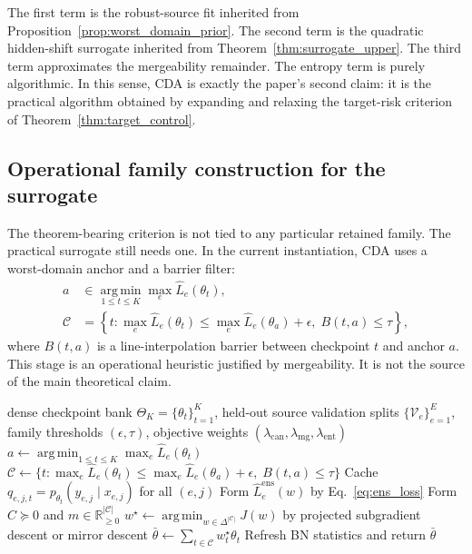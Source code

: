 \documentclass{article}
\theoremstyle{definition}
\newcommand{\RR}{\mathbb{R}}
\newcommand{\cC}{\mathcal{C}}
\newcommand{\cV}{\mathcal{V}}
\newcommand{\argmin}{\operatorname*{arg\,min}}
\newcommand{\cda}{\textup{\textsc{CDA}}}
\newcommand{\simplex}{\Delta}
\newcommand{\braces}[1]{\left\{ #1 \right\}}
\begin{document}
The first term is the robust-source fit inherited from Proposition~\ref{prop:worst_domain_prior}. The second term is the quadratic hidden-shift surrogate inherited from Theorem~\ref{thm:surrogate_upper}. The third term approximates the mergeability remainder. The entropy term is purely algorithmic. In this sense, \cda{} is exactly the paper's second claim: it is the practical algorithm obtained by expanding and relaxing the target-risk criterion of Theorem~\ref{thm:target_control}.

\subsection{Operational family construction for the surrogate}
\label{subsec:family}

The theorem-bearing criterion is not tied to any particular retained family. The practical surrogate still needs one. In the current instantiation, \cda{} uses a worst-domain anchor and a barrier filter:
\begin{align}
a &\in \argmin_{1\le t\le K} \max_e \widehat L_e(\theta_t),
\label{eq:anchor}\\
\cC
&=
\braces{
t :
\max_e \widehat L_e(\theta_t) \le \max_e \widehat L_e(\theta_a)+\epsilon,
\;
B(t,a)\le \tau
},
\label{eq:family}
\end{align}
where \(B(t,a)\) is a line-interpolation barrier between checkpoint \(t\) and anchor \(a\). This stage is an operational heuristic justified by mergeability. It is not the source of the main theoretical claim.

\begin{algorithm}[t]
\caption{\cda{} on a checkpoint bank}
\label{alg:cda}
\begin{algorithmic}[1]
\Require dense checkpoint bank \(\Theta_K=\{\theta_t\}_{t=1}^{K}\), held-out source validation splits \(\{\cV_e\}_{e=1}^{E}\), family thresholds \((\epsilon,\tau)\), objective weights \((\lambda_{\mathrm{can}},\lambda_{\mathrm{mg}},\lambda_{\mathrm{ent}})\)
\State \(a \gets \argmin_{1\le t\le K}\max_e \widehat L_e(\theta_t)\)
\State \(\cC \gets \{t:\max_e \widehat L_e(\theta_t)\le \max_e \widehat L_e(\theta_a)+\epsilon,\; B(t,a)\le\tau\}\)
\ForAll{\(t\in\cC\)}
    \State Cache \(q_{e,j,t}=p_{\theta_t}(y_{e,j}\mid x_{e,j})\) for all \((e,j)\)
\EndFor
\State Form \(\widehat L_e^{\mathrm{ens}}(w)\) by Eq.~\eqref{eq:ens_loss}
\State Form \(C\succeq 0\) and \(m\in\RR_{\ge 0}^{|\cC|}\)
\State \(w^\star \gets \argmin_{w\in\simplex^{|\cC|}} J(w)\) by projected subgradient descent or mirror descent
\State \(\bar\theta \gets \sum_{t\in\cC} w_t^\star \theta_t\)
\State Refresh BN statistics and return \(\bar\theta\)
\end{algorithmic}
\end{algorithm}
\end{document}
